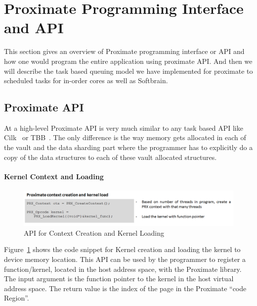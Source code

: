 \section{Proximate Programming Interface and API} \label{sec:prog}

This section gives an overview of Proximate programming interface or API
and how one would program the entire application using proximate API.
And then we will describe the task based queuing model we have implemented
for proximate to scheduled tasks for in-order cores as well as Softbrain.

\subsection{Proximate API}
At a high-level Proximate API is very much similar to any task based
API like Cilk~\cite{leiserson2010cilk++} or TBB~\cite{pheatt2008intel}.
The only difference is the way memory gets allocated in each of the
vault and the data sharding part where the programmer has to explicitly do a 
copy of the data structures to each of these vault allocated structures. 

\paragraph{Kernel Context and Loading}

\begin{figure}[h]
  \begin{center}
    \includegraphics[width=\linewidth]{cs758-figs/api-alloc.png}
  \end{center}
\vspace{-0.2in}
  \caption{API for Context Creation and Kernel Loading}
  \label{fig:api-kernel}
\vspace{-0.05in}
\end{figure}

Figure~\ref{fig:api-kernel} shows the code snippet for Kernel creation
and loading the kernel to device memory location. 
This API can be used by the programmer to register a function/kernel, 
located in the host address space, with the Proximate library. 
The input argument is the function pointer to the kernel in the host virtual address space.
The return value is the index of the page in the Proximate “code Region”.   

